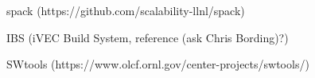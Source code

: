 spack (https://github.com/scalability-llnl/spack)

IBS (iVEC Build System, reference (ask Chris Bording)?)

SWtools (https://www.olcf.ornl.gov/center-projects/swtools/)
